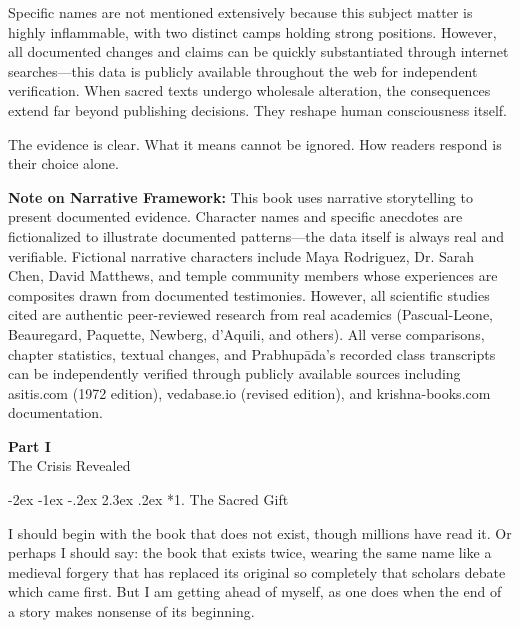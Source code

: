 \documentclass[12pt,twoside]{book}
\makeatletter
\def\cleardoublepage{\clearpage\if@twoside \ifodd\c@page\else\hbox{}\thispagestyle{empty}\newpage\if@twocolumn\hbox{}\newpage\fi\fi\fi}
\renewcommand\section{\@startsection{section}{1}{\z@}%
{-2ex \@plus -1ex \@minus -.2ex}%
{2.3ex \@plus.2ex}%
{\normalfont\Large\bfseries}}
\makeatother
\begin{document}
Specific names are not mentioned extensively because this subject matter is highly inflammable, with two distinct camps holding strong positions. However, all documented changes and claims can be quickly substantiated through internet searches—this data is publicly available throughout the web for independent verification. When sacred texts undergo wholesale alteration, the consequences extend far beyond publishing decisions. They reshape human consciousness itself.

The evidence is clear. What it means cannot be ignored. How readers respond is their choice alone.

\textbf{\textbf{Note on Narrative Framework:}} This book uses narrative storytelling to present documented evidence. Character names and specific anecdotes are fictionalized to illustrate documented patterns—the data itself is always real and verifiable. Fictional narrative characters include Maya Rodriguez, Dr. Sarah Chen, David Matthews, and temple community members whose experiences are composites drawn from documented testimonies. However, all scientific studies cited are authentic peer-reviewed research from real academics (Pascual-Leone, Beauregard, Paquette, Newberg, d'Aquili, and others). All verse comparisons, chapter statistics, textual changes, and Prabhupāda's recorded class transcripts can be independently verified through publicly available sources including asitis.com (1972 edition), vedabase.io (revised edition), and krishna-books.com documentation.

\clearpage
\pagestyle{empty}
\vspace*{0.20\textheight}
\begin{center}
{\Huge\bfseries Part I}\\[0.5cm]
{\Large The Crisis Revealed}
\end{center}
\vspace*{\fill}
\cleardoublepage
\pagestyle{fancy}
\vspace*{0.20\textheight}
\section*{1. The Sacred Gift}
\thispagestyle{chapterpage}

\normalfont\justifying
I should begin with the book that does not exist, though millions have read it. Or perhaps I should say: the book that exists twice, wearing the same name like a medieval forgery that has replaced its original so completely that scholars debate which came first. But I am getting ahead of myself, as one does when the end of a story makes nonsense of its beginning.
\end{document}
